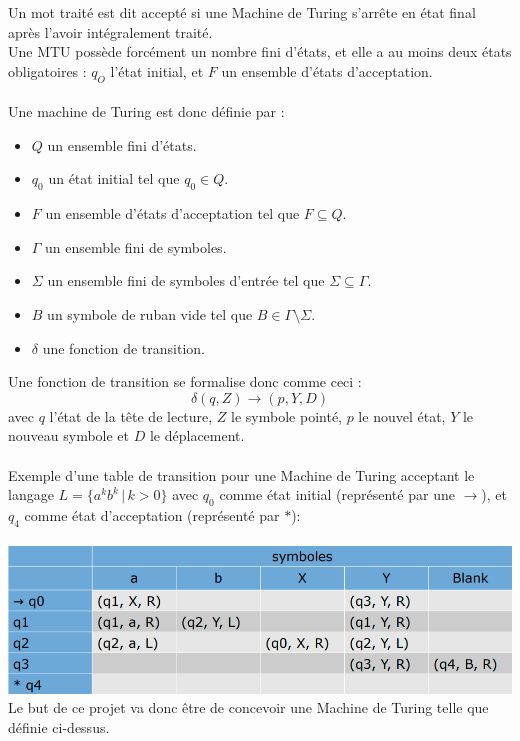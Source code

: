 \documentclass[12pt]{article}
\begin{document}
	 Un mot traité est dit accepté si une Machine de Turing s'arrête en état final après l'avoir intégralement traité.\\
	 Une MTU possède forcément un nombre fini d'états, et elle a au moins deux états obligatoires : $q_O$ l'état initial, et $F$ un ensemble d'états d'acceptation.\\
	 \\
	 Une machine de Turing est donc définie par :\\
	 \begin{itemize}[label=$-$]
	 	\item $Q$ un ensemble fini d'états.\\
	 	\item $q_0$ un état initial tel que $q_0 \in Q$.\\
	 	\item $F$ un ensemble d'états d'acceptation tel que $F \subseteq Q$.\\
	 	\item $\Gamma$ un ensemble fini de symboles.\\
	 	\item $\Sigma$ un ensemble fini de symboles d'entrée tel que $\Sigma \subseteq \Gamma$.\\
	 	\item $B$ un symbole de ruban vide tel que $B \in \Gamma \setminus \Sigma$.
	 	\item $\delta$ une fonction de transition.
	\end{itemize}
	 Une fonction de transition se formalise donc comme ceci :\\
	 \[ \delta (q, Z) \to (p, Y, D) \]
	 avec $q$ l'état de la tête de lecture, $Z$ le symbole pointé, $p$ le nouvel état, $Y$ le nouveau symbole et $D$ le déplacement.\\
	 \\
	 Exemple d'une table de transition pour une Machine de Turing acceptant le langage $L = \lbrace a^kb^k \, \vert \, k > 0 \rbrace$ avec $q_0$ comme état initial (représenté par une $\to$), et $q_4$ comme état d'acceptation (représenté par $\ast$):\\
	 \\
	 \includegraphics[width=\textwidth]{img/fig1}
	 \\
	 Le but de ce projet va donc être de concevoir une Machine de Turing telle que définie ci-dessus.
\end{document}
